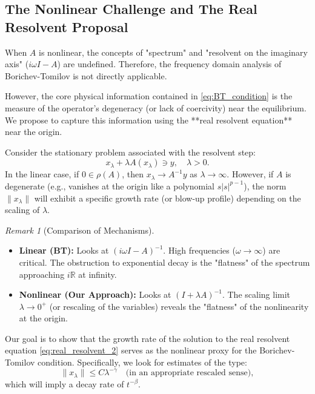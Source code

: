 \documentclass[11pt,reqno]{amsart}
\theoremstyle{remark}
\newtheorem{remark}[theorem]{Remark}
\begin{document}
\subsection{The Nonlinear Challenge and The Real Resolvent Proposal}
When $A$ is nonlinear, the concepts of "spectrum" and "resolvent on the imaginary axis" ($i\omega I - A$) are undefined. Therefore, the frequency domain analysis of Borichev-Tomilov is not directly applicable.

However, the core physical information contained in \eqref{eq:BT_condition} is the measure of the operator's degeneracy (or lack of coercivity) near the equilibrium. We propose to capture this information using the **real resolvent equation** near the origin.

Consider the stationary problem associated with the resolvent step:
\begin{equation} \label{eq:real_resolvent_2}
    x_\lambda + \lambda A(x_\lambda) \ni y, \quad \lambda > 0.
\end{equation}
In the linear case, if $0 \in \rho(A)$, then $x_\lambda \to A^{-1}y$ as $\lambda \to \infty$. However, if $A$ is degenerate (e.g., vanishes at the origin like a polynomial $s|s|^{p-1}$), the norm $\|x_\lambda\|$ will exhibit a specific growth rate (or blow-up profile) depending on the scaling of $\lambda$.

\begin{remark}[Comparison of Mechanisms]
    \leavevmode
    \begin{itemize}
        \item \textbf{Linear (BT):} Looks at $(i\omega I - A)^{-1}$. High frequencies ($\omega \to \infty$) are critical. The obstruction to exponential decay is the "flatness" of the spectrum approaching $i\mathbb{R}$ at infinity.
        \item \textbf{Nonlinear (Our Approach):} Looks at $(I + \lambda A)^{-1}$. The scaling limit $\lambda \to 0^+$ (or rescaling of the variables) reveals the "flatness" of the nonlinearity at the origin.
    \end{itemize}
    Our goal is to show that the growth rate of the solution to the real resolvent equation \eqref{eq:real_resolvent_2} serves as the nonlinear proxy for the Borichev-Tomilov condition. Specifically, we look for estimates of the type:
    \[
    \|x_\lambda\| \le C \lambda^{-\gamma} \quad \text{(in an appropriate rescaled sense)},
    \]
    which will imply a decay rate of $t^{-\beta}$.
\end{remark}
\end{document}
